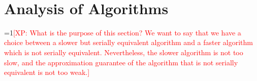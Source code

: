\documentclass{article} %
\newtheorem{cor}[thm]{Corollary}
\newtheorem{lem}[thm]{Lemma}
\newcommand{\Comments}{1}
\newcommand{\note}[2]{\ifnum\Comments=1\textcolor{#1}{#2}\fi}
\newcommand{\xinghao}[1]{\note{red}{[XP: #1]}}
\begin{document}
%

~











\section{Analysis of Algorithms}

\xinghao{What is the purpose of this section?
We want to say that we have a choice between a slower but serially equivalent algorithm and a faster algorithm which is not serially equivalent.
Nevertheless, the slower algorithm is not too slow, and the approximation guarantee of the algorithm that is not serially equivalent is not too weak.}
\end{document}
